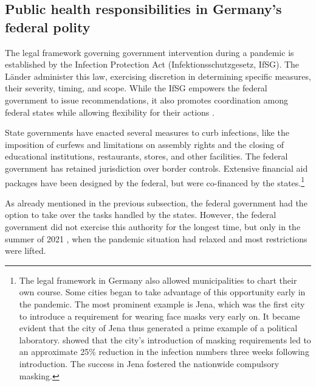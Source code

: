 \documentclass[12pt, abstracton]{scrartcl}
\begin{document}
\subsection{Public health responsibilities in Germany's federal polity}
The legal framework governing government intervention during a pandemic is established by the Infection Protection Act (Infektionsschutzgesetz, IfSG). The Länder administer this law, exercising discretion in determining specific measures, their severity, timing, and scope. While the IfSG empowers the federal government to issue recommendations, it also promotes coordination among federal states while allowing flexibility for their actions \citep{Tonti2022}.  

State governments have enacted several measures to curb infections, like the imposition of curfews and limitations on assembly rights and the closing of educational institutions, restaurants, stores, and other facilities. The federal government has retained jurisdiction over border controls. Extensive financial aid packages have been designed by the federal, but were co-financed by the states.\footnote{ 
	The legal framework in Germany also allowed municipalities to chart their own course. Some cities began to take advantage of this opportunity early in the pandemic. The most prominent example is Jena, which was the first city to introduce a requirement for wearing face masks very early on. It became evident that the city of Jena thus generated a prime example of a political laboratory. \cite{Mitze2020} showed that the city’s introduction of masking requirements led to an approximate 25\% reduction in the infection numbers three weeks following introduction. The success in Jena fostered the nationwide compulsory masking.
} 

As already mentioned in the previous subsection, the federal government had the option to take over the tasks handled by the states. However, the federal government did not exercise this authority for the longest time, but only in the summer of 2021 \citep{Rowe2023}, when the pandemic situation had relaxed and most restrictions were lifted.

\end{document}
